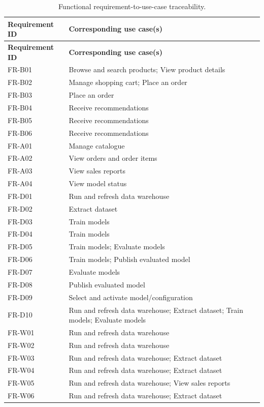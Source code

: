 \documentclass[a4paper,12pt]{article}
\newcommand{\tablestyle}{%
  \small\setstretch{1.05}%
  \renewcommand{\arraystretch}{1.25}%
  \setlength{\extrarowheight}{3pt}%
  \arrayrulecolor{tableborder}%
}
\newcommand{\req}[1]{\textsf{\small #1}}
\begin{document}
{\tablestyle
\begin{longtable}{|L{2.6cm}|L{\dimexpr\textwidth-2.6cm-4\arrayrulewidth\relax}|}
  \caption{Functional requirement-to-use-case traceability.}
  \label{tab:traceability}\\
  \hline
  \textbf{Requirement ID} & \textbf{Corresponding use case(s)} \\
  \hline
  \endfirsthead
  \hline
  \textbf{Requirement ID} & \textbf{Corresponding use case(s)} \\
  \hline
  \endhead
  \endfoot
  \endlastfoot
  \req{FR-B01} & Browse and search products; View product details \\[3pt]\hline
  \req{FR-B02} & Manage shopping cart; Place an order \\[3pt]\hline
  \req{FR-B03} & Place an order \\[3pt]\hline
  \req{FR-B04} & Receive recommendations \\[3pt]\hline
  \req{FR-B05} & Receive recommendations \\[3pt]\hline
  \req{FR-B06} & Receive recommendations \\[3pt]\hline
  \req{FR-A01} & Manage catalogue \\[3pt]\hline
  \req{FR-A02} & View orders and order items \\[3pt]\hline
  \req{FR-A03} & View sales reports \\[3pt]\hline
  \req{FR-A04} & View model status \\[3pt]\hline
  \req{FR-D01} & Run and refresh data warehouse \\[3pt]\hline
  \req{FR-D02} & Extract dataset \\[3pt]\hline
  \req{FR-D03} & Train models \\[3pt]\hline
  \req{FR-D04} & Train models \\[3pt]\hline
  \req{FR-D05} & Train models; Evaluate models \\[3pt]\hline
  \req{FR-D06} & Train models; Publish evaluated model \\[3pt]\hline
  \req{FR-D07} & Evaluate models \\[3pt]\hline
  \req{FR-D08} & Publish evaluated model \\[3pt]\hline
  \req{FR-D09} & Select and activate model/configuration \\[3pt]\hline
  \req{FR-D10} & Run and refresh data warehouse; Extract dataset; Train models; Evaluate models \\[3pt]\hline
  \req{FR-W01} & Run and refresh data warehouse \\[3pt]\hline
  \req{FR-W02} & Run and refresh data warehouse \\[3pt]\hline
  \req{FR-W03} & Run and refresh data warehouse; Extract dataset \\[3pt]\hline
  \req{FR-W04} & Run and refresh data warehouse; Extract dataset \\[3pt]\hline
  \req{FR-W05} & Run and refresh data warehouse; View sales reports \\[3pt]\hline
  \req{FR-W06} & Run and refresh data warehouse; Extract dataset \\[3pt]\hline
\end{longtable}
}
\end{document}

